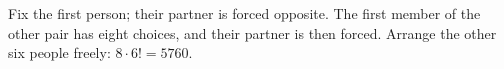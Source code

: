 Fix the first person; their partner is forced opposite. The first member of the other pair has eight choices, and their partner is then forced. Arrange the other six people freely: $8\cdot6!=\boxed{5760}$.
